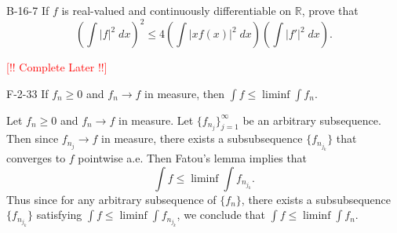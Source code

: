 \documentclass{article}
\newcommand{\complete}{\textcolor{red}{[!! Complete Later !!]}}
\begin{document}
	\begin{prb}{B-16-7}
		If $f$ is real-valued and continuously differentiable on $\mathbb{R}$, prove that 
		\begin{equation*}
			\left(\int |f|^{2}\;dx\right)^{2} \leq 4\left(\int |xf(x)|^2\;dx\right)\left(\int |f'|^2\;dx\right). 
		\end{equation*}
	\end{prb}
	\complete 
	
	\begin{prb}{F-2-33}
		If $f_{n} \geq 0$ and $f_{n} \to f$ in measure, then $\int f \leq \liminf\int f_{n}$. 
	\end{prb}
	Let $f_{n} \geq 0$ and $f_{n} \to f$ in measure. Let $\{f_{n_{j}}\}_{j = 1}^{\infty}$ be an arbitrary subsequence. Then since $f_{n_{j}} \to f$ in measure, there exists a subsubsequence $\{f_{n_{j_{k}}}\}$ that converges to $f$ pointwise a.e. Then Fatou's lemma implies that 
	\begin{equation*}
		\int f \leq \liminf \int f_{n_{j_{k}}}. 
	\end{equation*}
	Thus since for any arbitrary subsequence of $\{f_{n}\}$, there exists a subsubsequence $\{f_{n_{j_{k}}}\}$ satisfying $\int f \leq \liminf \int f_{n_{j_{k}}}$, we conclude that $\int f \leq \liminf \int f_{n}$. 
	
\end{document}
